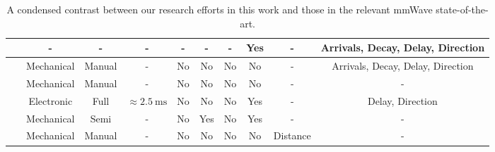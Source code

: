\documentclass[12pt, draftcls, onecolumn]{IEEEtran}
\begin{document}
\begin{table}
\begin{tabular}{|*{10}{c|}}
    \hline
   ~\cite{Indoor60G} & - & - & - & - & - & - & Yes & - & Arrivals, Decay, Delay, Direction\\
    \hline
   ~\cite{QDC_NIST} & Mechanical & Manual & - & No & No & No & No & - & Arrivals, Decay, Delay, Direction\\
    \hline
   ~\cite{D2DHumanBlockage} & Mechanical & Manual & - & No & No & No & No & - & -\\
    \hline
   ~\cite{DopplerHST} & Electronic & Full & ${\approx}\SI{2.5}{\milli\second}$ & No & No & No & Yes & - & Delay, Direction\\
    \hline
   ~\cite{V2XBlockages} & Mechanical & Semi & - & No & Yes & No & Yes & - & -\\
    \hline
   ~\cite{MacCartneyUrbanHumanBlockage} & Mechanical & Manual & - & No & No & No & No & Distance & -\\
    \hline
    \end{tabular}
    \vspace{-1mm}
    \caption{A condensed contrast between our research efforts in this work and those in the relevant mmWave state-of-the-art.}
    \label{T2}
\end{table}
\end{document}
